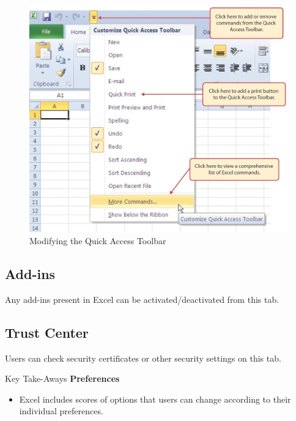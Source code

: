 \begin{figure}[H]
	\centering
	\includegraphics[width=\maxwidth{.75\linewidth}]{gfx/ch09_fig68}
	\caption{Modifying the Quick Access Toolbar}
	\label{09:fig68}
\end{figure}

\subsection{Add-ins}

Any add-ins present in Excel can be activated/deactivated from this tab.

\subsection{Trust Center}

Users can check security certificates or other security settings on this tab.

\begin{center}
	\begin{tkwbox}{Key Take-Aways}
		\textbf{Preferences}
		\\
		\begin{itemize}
			\setlength{\itemsep}{0pt}
			\setlength{\parskip}{0pt}
			\setlength{\parsep}{0pt}
			
			\item Excel includes scores of options that users can change according to their individual preferences.
			
		\end{itemize}
	\end{tkwbox}
\end{center}

